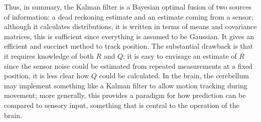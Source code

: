 \documentclass[12pt]{article}
\begin{document}
Thus, in summary, the Kalman filter is a Bayesian optimal fusion of
two sources of information: a dead reckoning estimate and an estimate
coming from a sensor; although it calculates distributions, it is
written in terms of means and covariance matrices, this is sufficient
since everything is assumed to be Gaussian. It gives an efficient and
succinct method to track position. The substantial drawback is that it
requires knowledge of both $R$ and $Q$; it is easy to envisage an
estimate of $R$ since the sensor noise could be estimated from
repeated measurements at a fixed position, it is less clear how $Q$
could be calculated. In the brain, the cerebellum may implement
something like a Kalman filter to allow motion tracking during
movement; more generally, this provides a paradigm for how prediction
can be compared to sensory input, something that is central to the
operation of the brain.


{}
\end{document}
